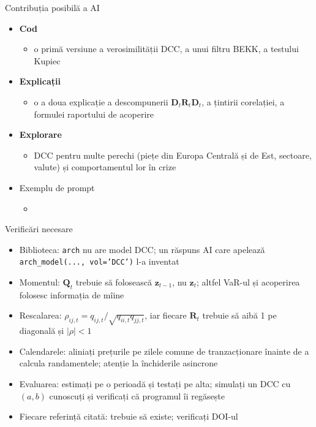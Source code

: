 \begin{frame}{Contribuția posibilă a AI}
\itemsize{\small}
\begin{itemize}
    \item \textbf{Cod}
    \begin{itemize}
        \item o primă versiune a verosimilității DCC, a unui filtru BEKK, a testului Kupiec
    \end{itemize}
    \item \textbf{Explicații}
    \begin{itemize}
        \item o a doua explicație a descompunerii $\mathbf{D}_t\mathbf{R}_t\mathbf{D}_t$, a țintirii corelației, a formulei raportului de acoperire
    \end{itemize}
    \item \textbf{Explorare}
    \begin{itemize}
        \item DCC pentru multe perechi (piețe din Europa Centrală și de Est, sectoare, valute) și comportamentul lor în crize
    \end{itemize}
    \item Exemplu de prompt
    \begin{itemize}
        \item {}
    \end{itemize}
\end{itemize}
\end{frame}

\begin{frame}{Verificări necesare}
\itemsize{\small}
\begin{itemize}
    \item Biblioteca: \texttt{arch} nu are model DCC; un răspuns AI care apelează \texttt{arch\_model(..., vol='DCC')} l-a inventat
    \item Momentul: $\mathbf{Q}_t$ trebuie să folosească $\mathbf{z}_{t-1}$, nu $\mathbf{z}_t$; altfel VaR-ul și acoperirea folosesc informația de mîine
    \item Rescalarea: $\rho_{ij,t} = q_{ij,t}/\sqrt{q_{ii,t}q_{jj,t}}$, iar fiecare $\mathbf{R}_t$ trebuie să aibă 1 pe diagonală și $|\rho| < 1$
    \item Calendarele: aliniați prețurile pe zilele comune de tranzacționare înainte de a calcula randamentele; atenție la închiderile asincrone
    \item Evaluarea: estimați pe o perioadă și testați pe alta; simulați un DCC cu $(a, b)$ cunoscuți și verificați că programul îi regăsește
    \item Fiecare referință citată: trebuie să existe; verificați DOI-ul
\end{itemize}
\end{frame}


